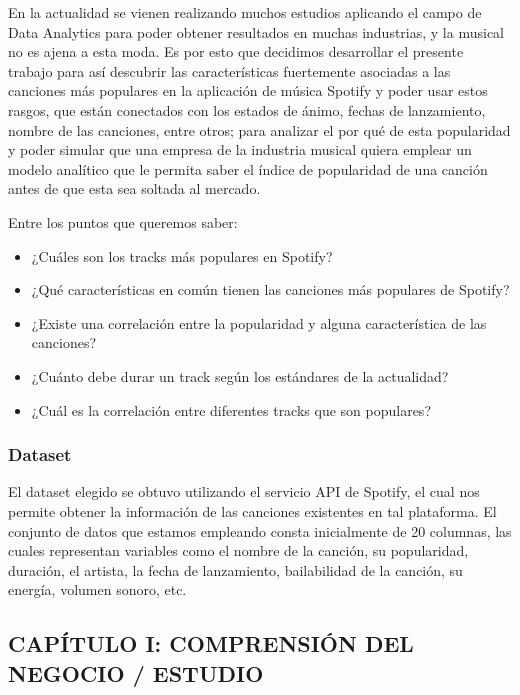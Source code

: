 \documentclass[
  letterpaper,
  DIV=11,
  numbers=noendperiod]{scrartcl}
\providecommand{\tightlist}{%
  \setlength{\itemsep}{0pt}\setlength{\parskip}{0pt}}
\begin{document}
En la actualidad se vienen realizando muchos estudios aplicando el campo
de Data Analytics para poder obtener resultados en muchas industrias, y
la musical no es ajena a esta moda. Es por esto que decidimos
desarrollar el presente trabajo para así descubrir las características
fuertemente asociadas a las canciones más populares en la aplicación de
música Spotify y poder usar estos rasgos, que están conectados con los
estados de ánimo, fechas de lanzamiento, nombre de las canciones, entre
otros; para analizar el por qué de esta popularidad y poder simular que
una empresa de la industria musical quiera emplear un modelo analítico
que le permita saber el índice de popularidad de una canción antes de
que esta sea soltada al mercado.

Entre los puntos que queremos saber:

\begin{itemize}
\tightlist
\item
  ¿Cuáles son los tracks más populares en Spotify?
\item
  ¿Qué características en común tienen las canciones más populares de
  Spotify?
\item
  ¿Existe una correlación entre la popularidad y alguna característica
  de las canciones?
\item
  ¿Cuánto debe durar un track según los estándares de la actualidad?
\item
  ¿Cuál es la correlación entre diferentes tracks que son populares?
\end{itemize}

\hypertarget{dataset}{%
\subsubsection{Dataset}\label{dataset}}

El dataset elegido se obtuvo utilizando el servicio API de Spotify, el
cual nos permite obtener la información de las canciones existentes en
tal plataforma. El conjunto de datos que estamos empleando consta
inicialmente de 20 columnas, las cuales representan variables como el
nombre de la canción, su popularidad, duración, el artista, la fecha de
lanzamiento, bailabilidad de la canción, su energía, volumen sonoro,
etc.

\hypertarget{capuxedtulo-i-comprensiuxf3n-del-negocio-estudio}{%
\subsection{CAPÍTULO I: COMPRENSIÓN DEL NEGOCIO /
ESTUDIO}\label{capuxedtulo-i-comprensiuxf3n-del-negocio-estudio}}
\end{document}

